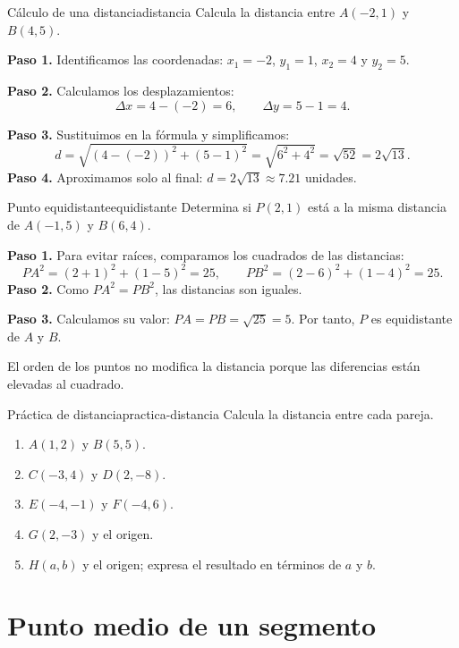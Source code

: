 \begin{example}{Cálculo de una distancia}{distancia}
Calcula la distancia entre $A(-2,1)$ y $B(4,5)$.
\begin{solution}
\textbf{Paso 1.} Identificamos las coordenadas:
$x_1=-2$, $y_1=1$, $x_2=4$ y $y_2=5$.

\textbf{Paso 2.} Calculamos los desplazamientos:
\[
\Delta x=4-(-2)=6,
\qquad
\Delta y=5-1=4.
\]

\textbf{Paso 3.} Sustituimos en la fórmula y simplificamos:
\[
d=\sqrt{(4-(-2))^2+(5-1)^2}
 =\sqrt{6^2+4^2}=\sqrt{52}=2\sqrt{13}.
\]
\textbf{Paso 4.} Aproximamos solo al final:
$d=2\sqrt{13}\approx 7.21$ unidades.
\end{solution}
\end{example}

\begin{example}{Punto equidistante}{equidistante}
Determina si $P(2,1)$ está a la misma distancia de $A(-1,5)$ y $B(6,4)$.
\begin{solution}
\textbf{Paso 1.} Para evitar raíces, comparamos los cuadrados de las
distancias:
\[
PA^2=(2+1)^2+(1-5)^2=25,
\qquad
PB^2=(2-6)^2+(1-4)^2=25.
\]
\textbf{Paso 2.} Como $PA^2=PB^2$, las distancias son iguales.

\textbf{Paso 3.} Calculamos su valor: $PA=PB=\sqrt{25}=5$. Por tanto, $P$
es equidistante de $A$ y $B$.
\end{solution}
\end{example}

\begin{remark}
El orden de los puntos no modifica la distancia porque las diferencias están
elevadas al cuadrado.
\end{remark}

\begin{exercise}{Práctica de distancia}{practica-distancia}
Calcula la distancia entre cada pareja.
\begin{enumerate}[label=\alph*)]
  \item $A(1,2)$ y $B(5,5)$.
  \item $C(-3,4)$ y $D(2,-8)$.
  \item $E(-4,-1)$ y $F(-4,6)$.
  \item $G(2,-3)$ y el origen.
  \item $H(a,b)$ y el origen; expresa el resultado en términos de $a$ y $b$.
\end{enumerate}
\end{exercise}

\section{Punto medio de un segmento}

